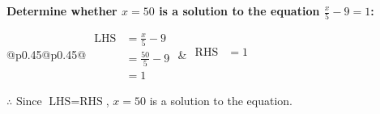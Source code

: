 \documentclass[12pt, varwidth, border=5mm]{standalone}
\begin{document}
    \noindent \textbf{Determine whether \(x = 50\) is a solution to the equation \(\frac{x}{5} - 9 = 1\):}
\vspace{4pt}  %

\noindent
\renewcommand{\arraystretch}{1.3} %
\begin{tabular}{@{}p{0.45\linewidth}@{}p{0.45\linewidth}@{}}
    \(\begin{aligned}
        \text{LHS} &= \frac{x}{5} - 9 \\
                   &= \frac{50}{5} - 9 \\
                   &= 1
    \end{aligned}\) &
    \(\begin{aligned}
        \text{RHS} &= 1\\
                   & \\
                   &
    \end{aligned}\)
\end{tabular}
\renewcommand{\arraystretch}{1.0} %
\vspace{2pt}  %

\noindent \(\therefore\) Since \(\text{LHS} = \text{RHS}\), \(x = 50\) is  a solution to the equation.
\end{document}

